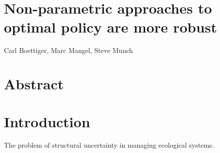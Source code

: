 \documentclass[author-year, review]{elsarticle} %
\begin{document}
\begin{frontmatter}
  \title{}
  \author[cstar]{Carl Boettiger}
  \author[noaa]{Stephan B. Munch}
  \author[cstar]{Marc Mangel}
  \address[cstar]{Center for Stock Assessment Research, Department of Applied Math and Statistics, University of California, Mail Stop SOE-2, Santa Cruz, CA 95064, USA}
  \address[noaa]{Southwest Fisheries Science Center, National Oceanic and Atmospheric Administration, 110 Shaffer Road, Santa Cruz, CA 95060, USA}
 \end{frontmatter}


\section{Non-parametric approaches to optimal policy are more robust}

Carl Boettiger, Marc Mangel, Steve Munch

\section{Abstract}

\section{Introduction}

The problem of structural uncertainty in managing ecological systems.
\end{document}
